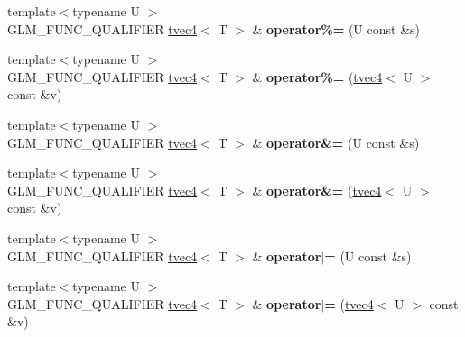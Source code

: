 \begin{DoxyCompactItemize}
\item 
\hypertarget{structglm_1_1detail_1_1tvec4_a379657cba0ba19e264f2716a22de8266}{{\footnotesize template$<$typename U $>$ }\\G\-L\-M\-\_\-\-F\-U\-N\-C\-\_\-\-Q\-U\-A\-L\-I\-F\-I\-E\-R \hyperlink{structglm_1_1detail_1_1tvec4}{tvec4}$<$ T $>$ \& {\bfseries operator\%=} (U const \&s)}\label{structglm_1_1detail_1_1tvec4_a379657cba0ba19e264f2716a22de8266}

\item 
\hypertarget{structglm_1_1detail_1_1tvec4_a88fdc82f178bc1b31e42277d969f6b85}{{\footnotesize template$<$typename U $>$ }\\G\-L\-M\-\_\-\-F\-U\-N\-C\-\_\-\-Q\-U\-A\-L\-I\-F\-I\-E\-R \hyperlink{structglm_1_1detail_1_1tvec4}{tvec4}$<$ T $>$ \& {\bfseries operator\%=} (\hyperlink{structglm_1_1detail_1_1tvec4}{tvec4}$<$ U $>$ const \&v)}\label{structglm_1_1detail_1_1tvec4_a88fdc82f178bc1b31e42277d969f6b85}

\item 
\hypertarget{structglm_1_1detail_1_1tvec4_a3280b9b1033cb5250630e6dc9e16bcd0}{{\footnotesize template$<$typename U $>$ }\\G\-L\-M\-\_\-\-F\-U\-N\-C\-\_\-\-Q\-U\-A\-L\-I\-F\-I\-E\-R \hyperlink{structglm_1_1detail_1_1tvec4}{tvec4}$<$ T $>$ \& {\bfseries operator\&=} (U const \&s)}\label{structglm_1_1detail_1_1tvec4_a3280b9b1033cb5250630e6dc9e16bcd0}

\item 
\hypertarget{structglm_1_1detail_1_1tvec4_ace770b5ddd6ed3d6de31db79f1d98684}{{\footnotesize template$<$typename U $>$ }\\G\-L\-M\-\_\-\-F\-U\-N\-C\-\_\-\-Q\-U\-A\-L\-I\-F\-I\-E\-R \hyperlink{structglm_1_1detail_1_1tvec4}{tvec4}$<$ T $>$ \& {\bfseries operator\&=} (\hyperlink{structglm_1_1detail_1_1tvec4}{tvec4}$<$ U $>$ const \&v)}\label{structglm_1_1detail_1_1tvec4_ace770b5ddd6ed3d6de31db79f1d98684}

\item 
\hypertarget{structglm_1_1detail_1_1tvec4_a8822b05828505f64f113004ead4b3bee}{{\footnotesize template$<$typename U $>$ }\\G\-L\-M\-\_\-\-F\-U\-N\-C\-\_\-\-Q\-U\-A\-L\-I\-F\-I\-E\-R \hyperlink{structglm_1_1detail_1_1tvec4}{tvec4}$<$ T $>$ \& {\bfseries operator$\vert$=} (U const \&s)}\label{structglm_1_1detail_1_1tvec4_a8822b05828505f64f113004ead4b3bee}

\item 
\hypertarget{structglm_1_1detail_1_1tvec4_a816ef935fcc5a08ba084e314bb1928f0}{{\footnotesize template$<$typename U $>$ }\\G\-L\-M\-\_\-\-F\-U\-N\-C\-\_\-\-Q\-U\-A\-L\-I\-F\-I\-E\-R \hyperlink{structglm_1_1detail_1_1tvec4}{tvec4}$<$ T $>$ \& {\bfseries operator$\vert$=} (\hyperlink{structglm_1_1detail_1_1tvec4}{tvec4}$<$ U $>$ const \&v)}\label{structglm_1_1detail_1_1tvec4_a816ef935fcc5a08ba084e314bb1928f0}


\end{DoxyCompactItemize}
